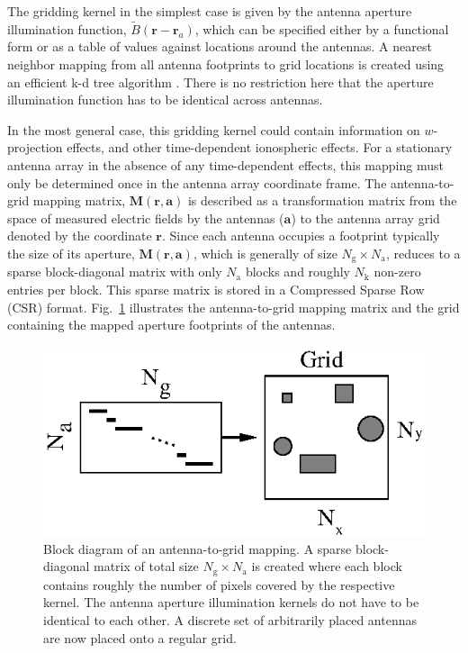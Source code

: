 \documentclass[a4paper,fleqn,usenatbib]{mnras}
\newcommand{\Nant}{N_\textrm{a}}
\newcommand{\Ngrid}{N_\textrm{g}}
\begin{document}
The gridding kernel in the simplest case is given by the antenna aperture
illumination function, $\widetilde{B}(\mathbf{r}-\mathbf{r}_a)$, which can
be specified either by a functional form or as a table of values against 
locations around the antennas. A nearest neighbor mapping from all antenna 
footprints to grid locations is created using an efficient k-d tree algorithm 
\citep{man99}. There is no restriction here that the aperture illumination 
function has to be identical across antennas. 

In the most general case, this gridding kernel could contain information on
$w$-projection effects, and other time-dependent ionospheric effects. For a
stationary antenna array in the absence of any time-dependent effects, this
mapping must only be determined once in the antenna array coordinate frame. The
antenna-to-grid mapping matrix, $\mathbf{M}(\mathbf{r},\mathbf{a})$ is described
as a transformation matrix from the space of measured electric fields by the 
antennas ($\mathbf{a}$) to the antenna array grid denoted by the coordinate 
$\mathbf{r}$. Since each antenna occupies a footprint typically the size of its 
aperture, $\mathbf{M}(\mathbf{r},\mathbf{a})$, which is generally of size
$\Ngrid\times \Nant$, reduces to a sparse block-diagonal matrix
with only $\Nant$ blocks and roughly $N_\textrm{k}$ non-zero entries per
block. This sparse matrix is stored in a Compressed Sparse Row (CSR) format. 
Fig.~\ref{fig:a2g-mapping} illustrates the antenna-to-grid mapping
matrix and the grid containing the mapped aperture footprints of the antennas.

\begin{figure}
  \includegraphics[width=\columnwidth]{a2g_mapping}
  \caption{Block diagram of an antenna-to-grid mapping. A sparse block-diagonal
    matrix of total size $\Ngrid\times \Nant$ is created where each
    block contains roughly the number of pixels covered by the respective kernel.
    The antenna aperture illumination kernels do not have to be identical to each
    other. A discrete set of arbitrarily placed antennas are now placed onto a
    regular grid.}
  \label{fig:a2g-mapping}
\end{figure}
\end{document}
